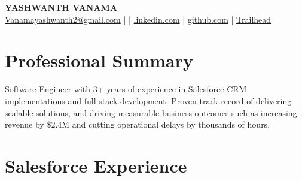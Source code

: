 \documentclass[a4paper,11pt]{article}
\begin{document}
\pagestyle{empty}

\begin{center}
    {\Huge \textbf{YASHWANTH VANAMA}} \\
    \vspace{1pt}
    \href{mailto:Vanamayashwanth2@gmail.com}{Vanamayashwanth2@gmail.com} \quad |  \quad | \quad
    \href{https://linkedin.com/in/yashwanth-vanama-873a75127/}{linkedin.com} \quad | \quad
    \href{https://github.com/yashwanthvanama}{github.com} \quad | \quad
    \href{https://www.salesforce.com/trailblazer/vyashwanth}{Trailhead}
\end{center}

\vspace{2pt}

\section*{Professional Summary}
Software Engineer with 3+ years of experience in Salesforce CRM implementations and full-stack development. Proven track record of delivering scalable solutions, and driving measurable business outcomes such as increasing revenue by \$2.4M and cutting operational delays by thousands of hours.

\section*{Salesforce Experience}
\end{document}
